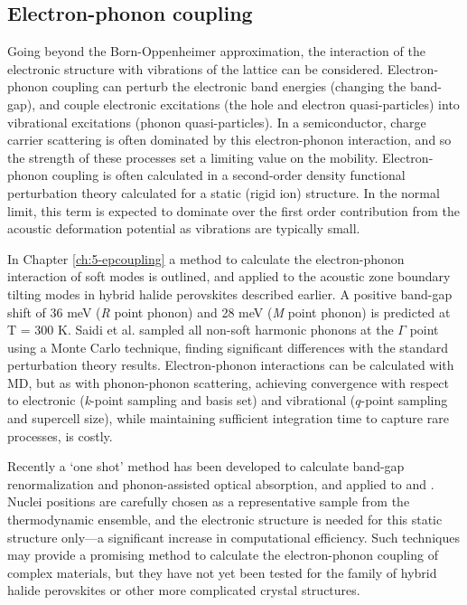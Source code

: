 \subsection{Electron-phonon coupling} \label{ch2epcoupling}

Going beyond the Born-Oppenheimer approximation, the interaction of the electronic structure with vibrations of the lattice can be considered. 
Electron-phonon coupling can perturb the electronic band energies (changing the band-gap), and couple electronic excitations (the hole and electron quasi-particles) into vibrational excitations (phonon quasi-particles). 
In a semiconductor, charge carrier scattering is often dominated by this electron-phonon interaction, and so the strength of these processes set a limiting value on the mobility. 
Electron-phonon coupling is often calculated in a second-order density functional perturbation theory calculated for a static (rigid ion) structure.
In the normal limit, this term is expected to dominate over the first order contribution from the acoustic deformation potential as vibrations are typically small. 

In Chapter \ref{ch:5-epcoupling} a method to calculate the electron-phonon interaction of soft modes is outlined, and applied to the acoustic zone boundary tilting modes in hybrid halide perovskites described earlier. 
A positive band-gap shift of 36 meV (\textit{R} point phonon) and 28 meV (\textit{M} point phonon) 
is predicted at T = 300 K.
%
Saidi et al. sampled all non-soft harmonic phonons at the $\Gamma$ point using a Monte Carlo technique,\autocite{Saidi2016} finding significant differences with the standard perturbation theory results.
%
Electron-phonon interactions can be calculated with MD, but as with phonon-phonon scattering, 
achieving convergence with respect to electronic (\textit{k}-point sampling and basis set) 
and vibrational ($q$-point sampling and supercell size), while maintaining sufficient integration time to capture rare processes, is costly.

Recently a `one shot' method has been developed to calculate band-gap renormalization and phonon-assisted optical absorption, and applied to  and .\autocite{Zacharias2016} 
Nuclei positions are carefully chosen as a representative sample from the thermodynamic ensemble, and the electronic structure is needed for this static structure only---a significant increase in computational efficiency. 
Such techniques may provide a promising method to calculate the electron-phonon coupling of complex materials, but they have not yet been tested for the family of hybrid halide perovskites or other more complicated crystal structures.

